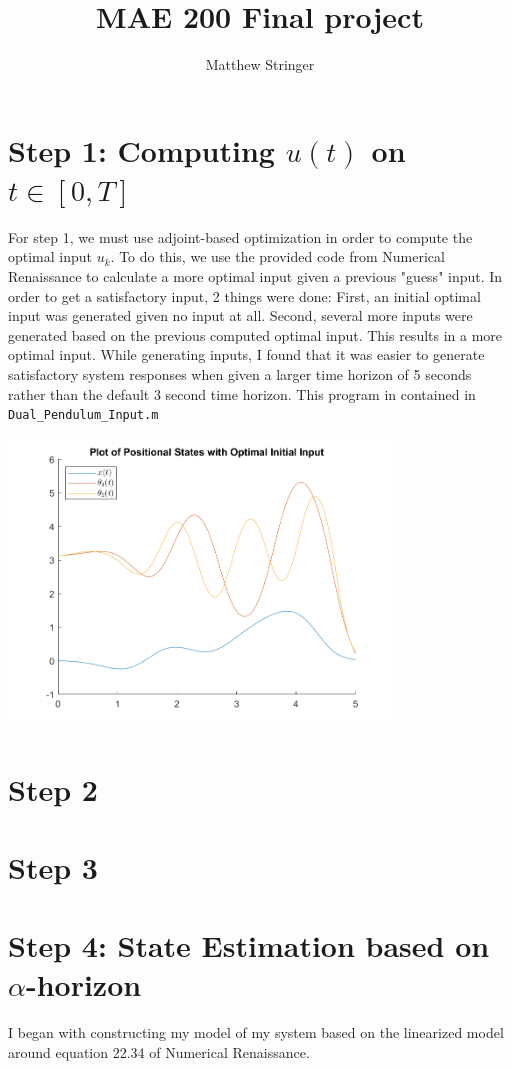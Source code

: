 \documentclass{article}
\title{MAE 200 Final project}
\author{Matthew Stringer}
\date{}
\theoremstyle{definition}
\begin{document}
    \maketitle
    \section*{Step 1: Computing $u(t)$ on $t \in [0,T]$}
    For step 1, we must use adjoint-based optimization in order to compute
    the optimal input $u_k$. To do this, we use the provided code from 
    Numerical Renaissance to calculate a more optimal input given a previous
    "guess" input. In order to get a satisfactory input, 2 things were done:
    First, an initial optimal input was generated given no input at all.
    Second, several more inputs were generated based on the previous computed
    optimal input.
    This results in a more optimal input.
    While generating inputs, I found that it was easier to generate satisfactory
    system responses when given a larger time horizon of 5 seconds rather than
    the default 3 second time horizon.
    This program in contained in \texttt{Dual\_Pendulum\_Input.m}
    \begin{center}
        \includegraphics*[width=4in]{Matlab Code/Step1_final_plot.png}
    \end{center}

    \section*{Step 2}
    
    \section*{Step 3}

    \section*{Step 4: State Estimation based on $\alpha$-horizon}
    I began with constructing my model of my system based on the linearized
    model around equation 22.34 of Numerical Renaissance. 
\end{document}
